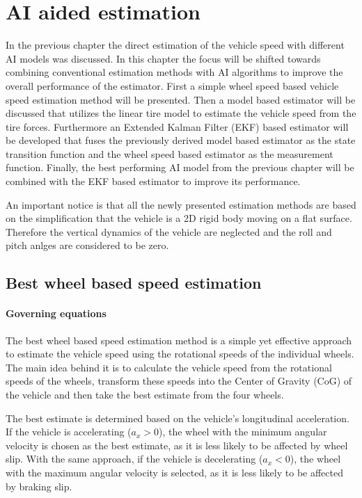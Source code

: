 \chapter{AI aided estimation}


In the previous chapter the direct estimation of the vehicle speed with different AI models was discussed. In this chapter the focus will be shifted towards combining conventional estimation methods with AI algorithms to improve the overall performance of the estimator. First a simple wheel speed based vehicle speed estimation method will be presented. Then a model based estimator will be discussed that utilizes the linear tire model to estimate the vehicle speed from the tire forces. Furthermore an Extended Kalman Filter (EKF) based estimator will be developed that fuses the previously derived model based estimator as the state transition function and the wheel speed based estimator as the measurement function. Finally, the best performing AI model from the previous chapter will be combined with the EKF based estimator to improve its performance.

An important notice is that all the newly presented estimation methods are based on the simplification that the vehicle is a 2D rigid body moving on a flat surface. Therefore the vertical dynamics of the vehicle are neglected and the roll and pitch anlges are considered to be zero.  

\section{Best wheel based speed estimation}
\label{sec:best_wheel_estimator}

\subsubsection{Governing equations}

The best wheel based speed estimation method is a simple yet effective approach to estimate the vehicle speed using the rotational speeds of the individual wheels. The main idea behind it is to calculate the vehicle speed from the rotational speeds of the wheels, transform these speeds into the Center of Gravity (CoG) of the vehicle and then take the best estimate from the four wheels. 

The best estimate is determined based on the vehicle's longitudinal acceleration. If the vehicle is accelerating ($a_x > 0$), the wheel with the minimum angular velocity is chosen as the best estimate, as it is less likely to be affected by wheel slip. With the same approach, if the vehicle is decelerating ($a_x <0$), the wheel with the maximum angular velocity is selected, as it is less likely to be affected by braking slip.

